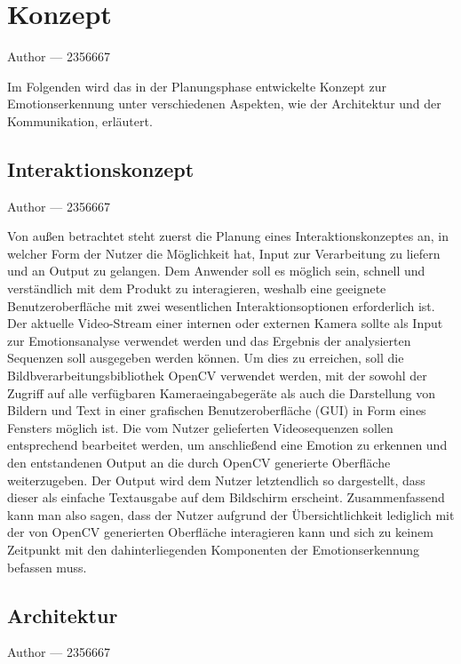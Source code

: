 \documentclass[12pt, a4paper]{report}
\makeatletter
\newcommand{\sectionauthor}[1]{%
  {\parindent0pt\vspace*{-5pt}%
  \large{Author --- }
  \linespread{1.1}\large\scshape#1%
  \par\nobreak\vspace*{35pt} }
  \@afterheading%
}
\makeatother
\begin{document}
\section{Konzept}
\sectionauthor{2356667}
Im Folgenden wird das in der Planungsphase entwickelte Konzept zur Emotionserkennung unter verschiedenen Aspekten, wie der Architektur und der Kommunikation, erläutert.

\subsection{Interaktionskonzept}
\sectionauthor{2356667}
Von außen betrachtet steht zuerst die Planung eines Interaktionskonzeptes an, in welcher Form der Nutzer die Möglichkeit hat, Input zur Verarbeitung zu liefern und an Output zu gelangen. Dem Anwender soll es möglich sein, schnell und verständlich mit dem Produkt zu interagieren, weshalb eine geeignete Benutzeroberfläche mit zwei wesentlichen Interaktionsoptionen erforderlich ist. Der aktuelle Video-Stream einer internen oder externen Kamera sollte als Input zur Emotionsanalyse verwendet werden und das Ergebnis der analysierten Sequenzen soll ausgegeben werden können. Um dies zu erreichen, soll die Bildbverarbeitungsbibliothek OpenCV verwendet werden, mit der sowohl der Zugriff auf alle verfügbaren Kameraeingabegeräte als auch die Darstellung von Bildern und Text in einer grafischen Benutzeroberfläche (GUI) in Form eines Fensters möglich ist. Die vom Nutzer gelieferten Videosequenzen sollen entsprechend bearbeitet werden, um anschließend eine Emotion zu erkennen und den entstandenen Output an die durch OpenCV generierte Oberfläche weiterzugeben. Der Output wird dem Nutzer letztendlich so dargestellt, dass dieser als einfache Textausgabe auf dem Bildschirm erscheint.\newline
Zusammenfassend kann man also sagen, dass der Nutzer aufgrund der Übersichtlichkeit lediglich mit der von OpenCV generierten Oberfläche interagieren kann und sich zu keinem Zeitpunkt mit den dahinterliegenden Komponenten der Emotionserkennung befassen muss.\newline

\subsection{Architektur}
\sectionauthor{2356667}
\end{document}

